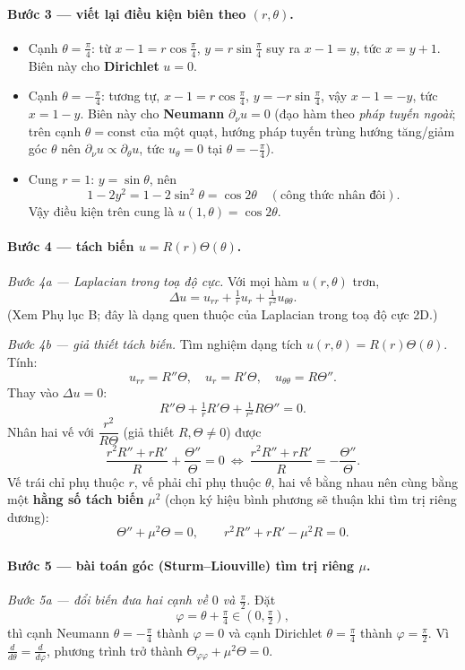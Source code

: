\paragraph{Bước 3 --- viết lại điều kiện biên theo $(r,\theta)$.}
\begin{itemize}
  \item Cạnh $\theta=\tfrac{\pi}{4}$: từ $x-1=r\cos\tfrac{\pi}{4}$, $y=r\sin\tfrac{\pi}{4}$ suy ra $x-1=y$, tức $x=y+1$. Biên này cho \textbf{Dirichlet} $u=0$.
  \item Cạnh $\theta=-\tfrac{\pi}{4}$: tương tự, $x-1=r\cos\tfrac{\pi}{4}$, $y=-r\sin\tfrac{\pi}{4}$, vậy $x-1=-y$, tức $x=1-y$. Biên này cho \textbf{Neumann} $\partial_\nu u=0$ (đạo hàm theo \emph{pháp tuyến ngoài}; trên cạnh $\theta=\text{const}$ của một quạt, hướng pháp tuyến trùng hướng tăng/giảm góc $\theta$ nên $\partial_\nu u\propto\partial_\theta u$, tức $u_\theta=0$ tại $\theta=-\tfrac{\pi}{4}$).
  \item Cung $r=1$: $y=\sin\theta$, nên
  \[
    1-2y^2=1-2\sin^2\theta=\cos 2\theta \quad(\text{công thức nhân đôi}).
  \]
  Vậy điều kiện trên cung là $u(1,\theta)=\cos 2\theta$.
\end{itemize}

\paragraph{Bước 4 --- tách biến $u=R(r)\Theta(\theta)$.}
\emph{Bước 4a --- Laplacian trong toạ độ cực.} Với mọi hàm $u(r,\theta)$ trơn,
\[
  \Delta u = u_{rr}+\tfrac{1}{r}u_r+\tfrac{1}{r^2}u_{\theta\theta}.
\]
(Xem Phụ lục B; đây là dạng quen thuộc của Laplacian trong toạ độ cực 2D.)

\emph{Bước 4b --- giả thiết tách biến.} Tìm nghiệm dạng tích $u(r,\theta)=R(r)\Theta(\theta)$. Tính:
\[
  u_{rr}=R''\Theta,\quad u_r=R'\Theta,\quad u_{\theta\theta}=R\Theta''.
\]
Thay vào $\Delta u=0$:
\[
  R''\Theta+\tfrac{1}{r}R'\Theta+\tfrac{1}{r^2}R\Theta''=0.
\]
Nhân hai vế với $\dfrac{r^2}{R\Theta}$ (giả thiết $R,\Theta\ne0$) được
\[
  \frac{r^2 R''+r R'}{R}+\frac{\Theta''}{\Theta}=0
  \ \Longleftrightarrow\ \frac{r^2 R''+r R'}{R}=-\frac{\Theta''}{\Theta}.
\]
Vế trái chỉ phụ thuộc $r$, vế phải chỉ phụ thuộc $\theta$, hai vế bằng nhau nên cùng bằng một \textbf{hằng số tách biến} $\mu^2$ (chọn ký hiệu bình phương sẽ thuận khi tìm trị riêng dương):
\[
  \Theta''+\mu^2\Theta=0,\qquad r^2 R''+r R'-\mu^2 R=0.
\]

\paragraph{Bước 5 --- bài toán góc (Sturm--Liouville) tìm trị riêng $\mu$.}
\emph{Bước 5a --- đổi biến đưa hai cạnh về $0$ và $\tfrac{\pi}{2}$.} Đặt
\[
  \varphi=\theta+\tfrac{\pi}{4}\in(0,\tfrac{\pi}{2}),
\]
thì cạnh Neumann $\theta=-\tfrac{\pi}{4}$ thành $\varphi=0$ và cạnh Dirichlet $\theta=\tfrac{\pi}{4}$ thành $\varphi=\tfrac{\pi}{2}$. Vì $\tfrac{d}{d\theta}=\tfrac{d}{d\varphi}$, phương trình trở thành $\Theta_{\varphi\varphi}+\mu^2\Theta=0$.

